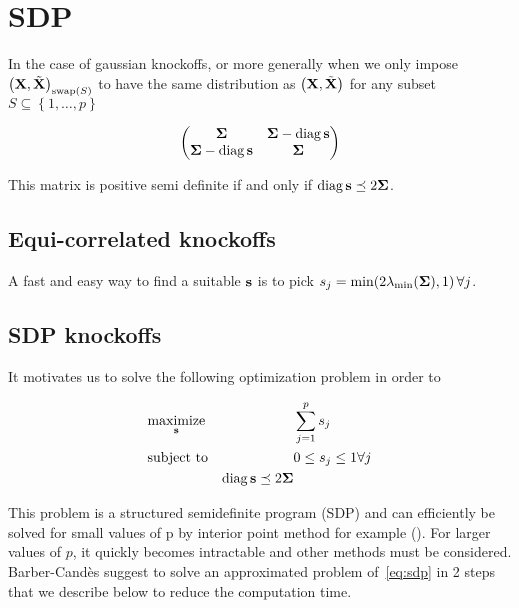 \chapter{SDP}\label{ch:sdp}

In the case of gaussian knockoffs,
or more generally when we only impose $\left(\mathbf{X}, \tilde{\mathbf{X}}\right)_{\operatorname{swap}\left( S \right)}$ to have the same distribution
as $\left(\mathbf{X}, \tilde{\mathbf{X}}\right)$ for any subset $S \subseteq \left\{ 1, \dots, p \right\}$

\[
\left(\begin{array}{@{}cc@{}}
  \mathbf{\Sigma}
  & \mathbf{\Sigma} - \diag \bs\\
  \mathbf{\Sigma} - \diag \bs
  & \mathbf{\Sigma}
\end{array}\right)
\]

This matrix is positive semi definite if and only if $\operatorname*{diag} \mathbf{s} \preceq 2 \bm{\Sigma}$.

\section{Equi-correlated knockoffs}\label{sec:equi}

A fast and easy way to find a suitable $\mathbf{s}$ is to pick $s_j = \min(2\lambda_{\text{min}}(\bm{\Sigma}), 1) \,\forall j$.

\section{SDP knockoffs}\label{sec:sdp}


It motivates us to solve the following optimization problem in order to

\begin{equation*}\label{eq:sdp}
\begin{aligned}
    & \underset{\mathbf{s}}{\text{maximize}}
    & & \sum_{j = 1}^p s_j\\
    & \text{subject to}
    & & 0 \leq s_j \leq 1 \forall j\\
    & & \operatorname*{diag} \mathbf{s} \preceq 2 \bm{\Sigma}
\end{aligned}
\end{equation*}

This problem is a structured semidefinite program (SDP) and can efficiently be solved for small values of p by interior point method for
example (\cite{interior_point_method_sdp}).
For larger values of $p$, it quickly becomes intractable and other methods must be considered.
Barber-Candès suggest to solve an approximated problem of~\ref{eq:sdp} in 2 steps that we describe below to reduce the computation time.

